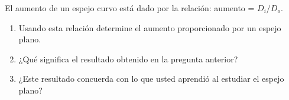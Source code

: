 
El aumento de un espejo curvo está dado por la relación: aumento = $D_i / D_o$.
\begin{enumerate}
    \item Usando esta relación determine el aumento proporcionado por un espejo plano.
    \item ¿Qué significa el resultado obtenido en la pregunta anterior?
    \item ¿Este resultado concuerda con lo que usted aprendió al estudiar el espejo plano?
\end{enumerate}
